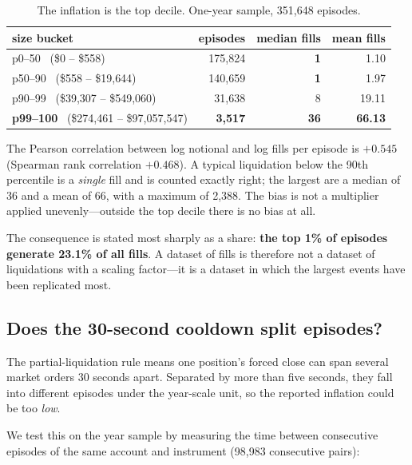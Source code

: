 \documentclass[11pt,a4paper]{article}
\begin{document}
\begin{table}[htbp]
\centering
\caption{The inflation is the top decile. One-year sample, 351{,}648 episodes.}
\label{tab:size}
\begin{tabular}{lrrr}
\toprule
size bucket & episodes & median fills & mean fills \\
\midrule
p0--50 \ (\$0 -- \$558) & 175{,}824 & \textbf{1} & 1.10 \\
p50--90 \ (\$558 -- \$19{,}644) & 140{,}659 & \textbf{1} & 1.97 \\
p90--99 \ (\$39{,}307 -- \$549{,}060) & 31{,}638 & 8 & 19.11 \\
\textbf{p99--100} \ (\$274{,}461 -- \$97{,}057{,}547) & \textbf{3{,}517} & \textbf{36} & \textbf{66.13} \\
\bottomrule
\end{tabular}
\end{table}

The Pearson correlation between log notional and log fills per episode is $+0.545$
(Spearman rank correlation $+0.468$). A typical
liquidation below the 90th percentile is a \emph{single} fill and is counted exactly right;
the largest are a median of 36 and a mean of 66, with a maximum of 2{,}388. The bias is not a
multiplier applied unevenly---outside the top decile there is no bias at all.

The consequence is stated most sharply as a share: \textbf{the top 1\% of episodes generate
23.1\% of all fills}. A dataset of fills is therefore not a dataset of liquidations with a
scaling factor---it is a dataset in which the largest events have been replicated most.

\subsection{Does the 30-second cooldown split episodes?}
\label{sec:cooldown}

The partial-liquidation rule means one position's forced close can span several market orders
30 seconds apart. Separated by more than five seconds, they fall into different episodes under
the year-scale unit, so the reported inflation could be too \emph{low}.

We test this on the year sample by measuring the time between consecutive episodes of the same
account and instrument (98{,}983 consecutive pairs):
\end{document}
